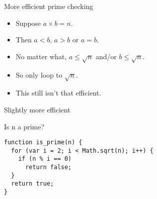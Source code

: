 \documentclass{beamer}
\begin{document}
\begin{frame}[fragile]{More efficient prime checking}
  \begin{itemize}
    \item Suppose $a \times b = n$.
    \item Then $a < b$, $a > b$ or $a = b$.
    \item No matter what, $a \le \sqrt{n}$ and/or $b \le \sqrt{n}$.
    \item So only loop to $\sqrt{n}$.
    \item This still isn't that efficient.
  \end{itemize}
\end{frame}

\begin{frame}[fragile]{Slightly more efficient}
  \begin{alertblock}{Is n a prime?}
    \begin{verbatim}
function is_prime(n) {
  for (var i = 2; i < Math.sqrt(n); i++) {
    if (n % i == 0)
      return false;
  }
  return true;
}
    \end{verbatim}
  \end{alertblock}
\end{frame}

\end{document}
